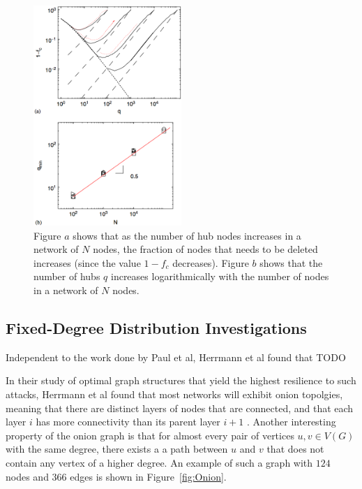 \documentclass[doc]{apa}%
\begin{document}
\begin{figure}[h!]
	\label{fractionalResults}
	\centering
		\includegraphics[width=0.5\textwidth]{fractional_results.png}
	\caption{Figure $a$ shows that as the number of hub nodes increases in a network of $N$ nodes, the fraction of nodes that needs to be deleted increases (since the value $1 - f_c$ decreases). Figure $b$ shows that the number of hubs $q$ increases logarithmically with the number of nodes in a network of $N$ nodes.}
\end{figure}


\subsection{Fixed-Degree Distribution Investigations}

Independent to the work done by Paul et al, Herrmann et al found that TODO

In their study of optimal graph structures that yield the highest resilience to such attacks, Herrmann et al found that most networks will exhibit onion topolgies, meaning that there are distinct layers of nodes that are connected, and that each layer $i$ has more connectivity than its parent layer $i+1$ \cite{Onion}. Another interesting property of the onion graph is that for almost every pair of vertices $u, v \in V(G)$ with the same degree, there exists a a path between $u$ and $v$ that does not contain any vertex of a higher degree. An example of such a graph with $124$ nodes and $366$ edges is shown in Figure~\ref{fig:Onion}.
\end{document}
